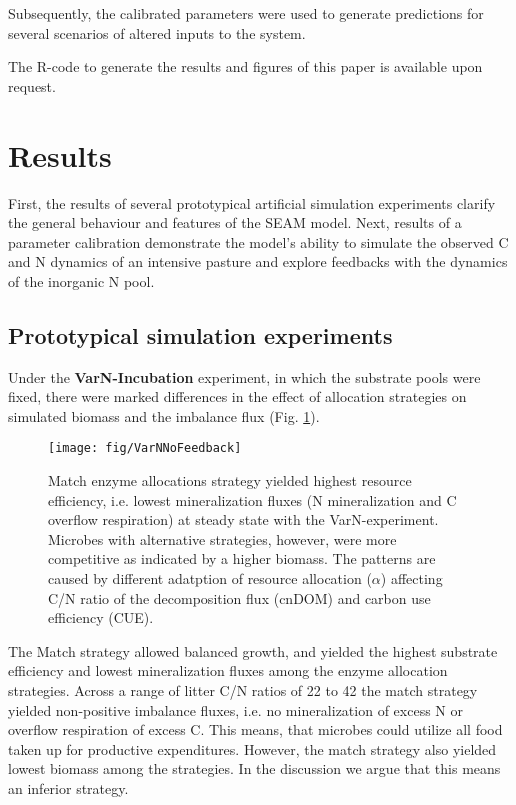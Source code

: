 Subsequently, the calibrated parameters were used to generate
predictions for several scenarios of altered inputs to the system.

The R-code to generate the results and figures of this paper is available upon
request. 
 

\section{Results}

First, the results of several prototypical artificial simulation experiments
clarify the general behaviour and features of the SEAM model. Next, results of a
parameter calibration demonstrate the model's ability to
simulate the observed C and N dynamics of an intensive pasture and explore
feedbacks with the dynamics of the inorganic N pool.

\subsection{Prototypical simulation experiments}
\label{sec:ResultsProto}

Under the \textbf{VarN-Incubation} experiment, in which the substrate pools were fixed,
there were marked differences in the effect of allocation strategies on simulated biomass and the imbalance flux (Fig.
\ref{fig:VarNNoFeedback}).
 
\begin{figure}[t] \vspace*{2mm}
\begin{center}
\texttt{[image: fig/VarNNoFeedback]}
\end{center}
\caption{
Match enzyme allocations strategy yielded highest resource efficiency, i.e.
lowest mineralization fluxes (N mineralization and C overflow respiration) at
steady state with the VarN-experiment.
Microbes with alternative strategies, however, were more competitive as
indicated by a higher biomass. The patterns are caused by different adatption of
resource allocation ($\alpha$) affecting C/N ratio of the decomposition flux
(cnDOM) and carbon use efficiency (CUE).
\label{fig:VarNNoFeedback}} 
\end{figure}

The Match strategy allowed balanced growth, and yielded the highest substrate
efficiency and lowest mineralization fluxes among the enzyme allocation
strategies. Across a range of litter C/N ratios of 22 to 42 the match strategy
yielded non-positive imbalance fluxes, i.e. no mineralization of excess N or
overflow respiration of excess C. This means, that microbes could utilize all food taken
up for productive expenditures. However, the match strategy also
yielded lowest biomass among the strategies. In the discussion we argue that
this means an inferior strategy.

